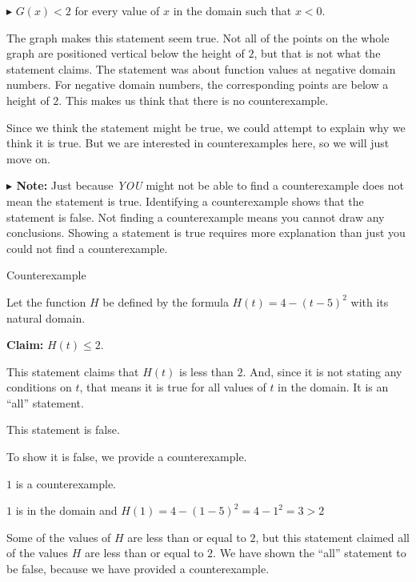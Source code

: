 \documentclass{ximera}
\begin{document}
\textbf{\textcolor{red!70!darkgray}{$\blacktriangleright$}} $G(x) < 2$  for every value of $x$ in the domain such that $x < 0$. 

The graph makes this statement seem true.  Not all of the points on the whole graph are positioned vertical below the height of $2$, but that is not what the statement claims. The statement was about function values at negative domain numbers. For negative domain numbers, the corresponding points are below a height of $2$.  This makes us think that there is no counterexample.  

Since we think the statement might be true, we could attempt to explain why we think it is true.  But we are interested in counterexamples here, so we will just move on.








\textbf{$\blacktriangleright$ Note:}  Just because \textit{YOU} might not be able to find a counterexample does not mean the statement is true.  Identifying a counterexample shows that the statement is false. Not finding a counterexample means you cannot draw any conclusions.  Showing a statement is true requires more explanation than just you could not find a counterexample. 







\begin{example}  Counterexample



Let the function $H$ be defined by the formula $H(t) = 4 - (t-5)^2$ with its natural domain. 

\textbf{\textcolor{blue!55!black}{Claim:}} $H(t) \leq 2$.  



This statement claims that $H(t)$ is less than $2$.  And, since it is not stating any conditions on $t$, that means it is true for all values of $t$ in the domain.  It is an ``all'' statement. 

This statement is false. 

To show it is false, we provide a counterexample. 


$1$ is a counterexample. 


$1$ is in the domain and  $H(1) = 4 - (1-5)^2 = 4 - 1^2 = 3 > 2$ 



Some of the values of $H$ are less than or equal to $2$, but this statement claimed all of the values $H$ are less than or equal to $2$.  We have shown the ``all'' statement to be false, because we have provided a counterexample.



\end{example}
\end{document}
